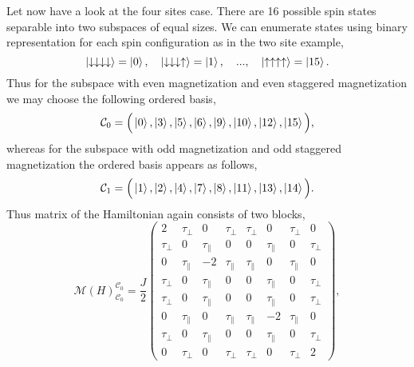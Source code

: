 \documentclass[12pt, a4paper]{article}
\begin{document}
Let now have a look at the four sites case. There are 16 possible spin states separable into two subspaces of equal sizes. We can enumerate states using binary representation for each spin configuration as in the two site example, 
\begin{equation}
\ket{\downarrow\downarrow\downarrow\downarrow} = \ket{0}, \quad \ket{\downarrow\downarrow\downarrow\uparrow} = \ket{1}, \quad ..., \quad \ket{\uparrow\uparrow\uparrow\uparrow} = \ket{15}.
\end{equation}
Thus for the subspace with even magnetization and even staggered magnetization we may choose the following ordered basis,
\begin{equation}
\mathcal{C}_0 = \Big( \ket{0}, \ket{3}, \ket{5}, \ket{6}, \ket{9}, \ket{10}, \ket{12}, \ket{15} \Big),
\end{equation}
whereas for the subspace with odd magnetization and odd staggered magnetization the ordered basis appears as follows,
\begin{equation}
\mathcal{C}_1 = \Big( \ket{1}, \ket{2}, \ket{4}, \ket{7}, \ket{8}, \ket{11}, \ket{13}, \ket{14} \Big).
\end{equation}
Thus matrix of the Hamiltonian again consists of two blocks,
\begin{equation}
\mathcal{M}(H)_{\mathcal{C}_0}^{\mathcal{C}_0} = \frac{J}{2} \begin{pmatrix}
2 & \tau_{\perp} & 0 & \tau_{\perp} & \tau_{\perp} & 0 & \tau_{\perp} & 0 \\
\tau_{\perp} & 0 & \tau_{\parallel} & 0 & 0 & \tau_{\parallel}  & 0 & \tau_{\perp}\\
0 & \tau_{\parallel}  & -2 & \tau_{\parallel} & \tau_{\parallel}  & 0 & \tau_{\parallel}  & 0 \\
\tau_{\perp}& 0 & \tau_{\parallel} & 0 & 0 & \tau_{\parallel}  & 0 & \tau_{\perp} \\
\tau_{\perp}& 0 & \tau_{\parallel} & 0 & 0 & \tau_{\parallel}  & 0 & \tau_{\perp} \\
0 & \tau_{\parallel}  & 0 & \tau_{\parallel} & \tau_{\parallel}  & -2 & \tau_{\parallel}  & 0 \\
\tau_{\perp} & 0 & \tau_{\parallel} & 0 & 0 & \tau_{\parallel}  & 0 & \tau_{\perp}\\
0 & \tau_{\perp} & 0 & \tau_{\perp} & \tau_{\perp} & 0 & \tau_{\perp} & 2
\end{pmatrix},
\end{equation}
\end{document}
